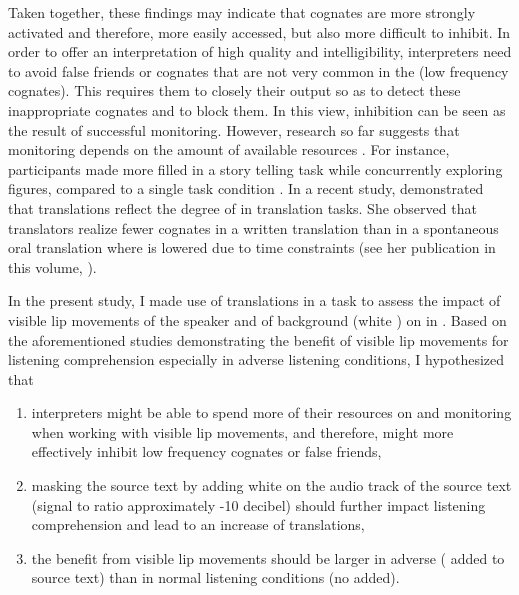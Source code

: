 \documentclass[output=paper]{LSP/langsci}
\begin{document}
Taken together, these findings may indicate that cognates are more strongly activated and therefore, more easily accessed, but also more difficult to inhibit. In order to offer an interpretation of high quality and intelligibility, interpreters need to avoid false friends or cognates that are not very common in the  (low frequency cognates). This requires them to closely  their output so as to detect these inappropriate cognates and to block them. In this view, inhibition can be seen as the result of successful monitoring. However, research so far suggests that monitoring depends on the amount of available resources \citep{Postma2000, Kessel2014}. For instance, participants made more filled  in a story telling task while concurrently exploring figures, compared to a single task condition \citep{Oomen2001}. In a recent study,  demonstrated that  translations reflect the degree of  in translation tasks. She observed that translators realize fewer cognates in a written translation than in a spontaneous oral translation where  is lowered due to time constraints (see her publication in this volume, \pageref{oster:sec:1}). 

In the present study, I made use of  translations in a  task to assess the impact of visible lip movements of the speaker and of background  (white ) on  in . Based on the aforementioned studies demonstrating the benefit of visible lip movements for listening comprehension especially in adverse listening conditions, I hypothesized that 

\begin{enumerate}
\item interpreters might be able to spend more of their resources on  and monitoring when working with visible lip movements, and therefore, might more effectively inhibit low frequency cognates or false friends,
\item masking the source text by adding white  on the audio track of the source text (signal to  ratio approximately -10 decibel) should further impact listening comprehension and lead to an increase of  translations, 
\item the benefit from visible lip movements should be larger in adverse ( added to source text) than in normal listening conditions (no  added).
\end{enumerate}
\end{document}

